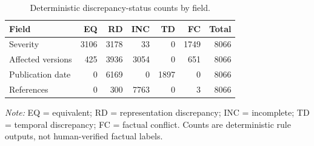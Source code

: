 \begin{table}[t]
\centering
\caption{Deterministic discrepancy-status counts by field.}
\label{tab:rq1-status}
\footnotesize
\setlength{\tabcolsep}{3pt}
\begin{tabular}{lrrrrrr}
\toprule
Field & EQ & RD & INC & TD & FC & Total \\
\midrule
Severity & 3106 & 3178 & 33 & 0 & 1749 & 8066 \\
Affected versions & 425 & 3936 & 3054 & 0 & 651 & 8066 \\
Publication date & 0 & 6169 & 0 & 1897 & 0 & 8066 \\
References & 0 & 300 & 7763 & 0 & 3 & 8066 \\
\bottomrule
\end{tabular}
\begin{minipage}{0.98\linewidth}
\footnotesize\textit{Note:} EQ = equivalent; RD = representation discrepancy; INC = incomplete; TD = temporal discrepancy; FC = factual conflict. Counts are deterministic rule outputs, not human-verified factual labels.
\end{minipage}
\end{table}
